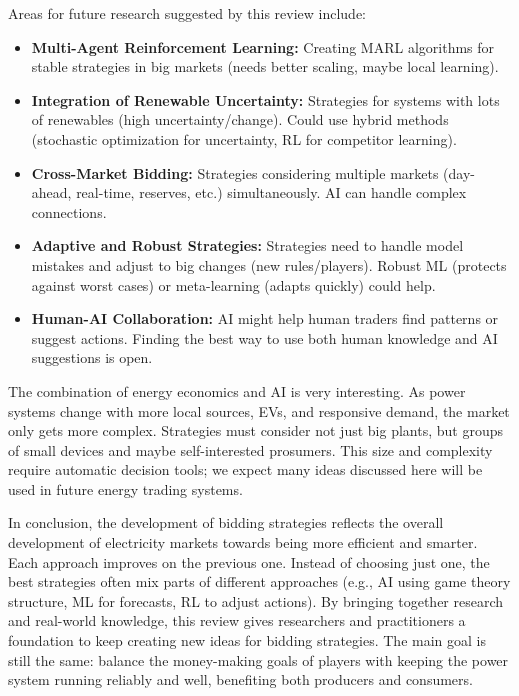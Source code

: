 \documentclass[conference]{IEEEtran}
\begin{document}
Areas for future research suggested by this review include:
\begin{itemize}
    \item \textbf{Multi-Agent Reinforcement Learning:} Creating MARL algorithms for stable strategies in big markets (needs better scaling, maybe local learning).
    \item \textbf{Integration of Renewable Uncertainty:} Strategies for systems with lots of renewables (high uncertainty/change). Could use hybrid methods (stochastic optimization for uncertainty, RL for competitor learning).
    \item \textbf{Cross-Market Bidding:} Strategies considering multiple markets (day-ahead, real-time, reserves, etc.) simultaneously. AI can handle complex connections.
    \item \textbf{Adaptive and Robust Strategies:} Strategies need to handle model mistakes and adjust to big changes (new rules/players). Robust ML (protects against worst cases) or meta-learning (adapts quickly) could help.
    \item \textbf{Human-AI Collaboration:} AI might help human traders find patterns or suggest actions. Finding the best way to use both human knowledge and AI suggestions is open.
\end{itemize}

The combination of energy economics and AI is very interesting. As power systems change with more local sources, EVs, and responsive demand, the market only gets more complex. Strategies must consider not just big plants, but groups of small devices and maybe self-interested prosumers. This size and complexity require automatic decision tools; we expect many ideas discussed here will be used in future energy trading systems.

In conclusion, the development of bidding strategies reflects the overall development of electricity markets towards being more efficient and smarter. Each approach improves on the previous one. Instead of choosing just one, the best strategies often mix parts of different approaches (e.g., AI using game theory structure, ML for forecasts, RL to adjust actions). By bringing together research and real-world knowledge, this review gives researchers and practitioners a foundation to keep creating new ideas for bidding strategies. The main goal is still the same: balance the money-making goals of players with keeping the power system running reliably and well, benefiting both producers and consumers.
\end{document}
